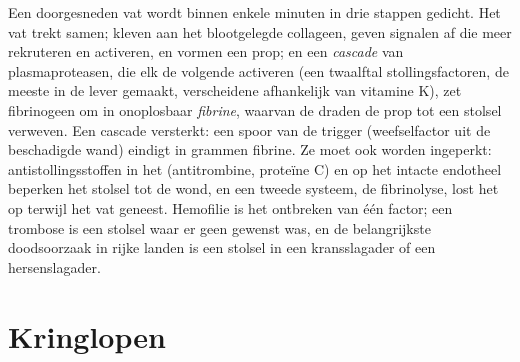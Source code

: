 \begin{proposition}[Hemostase]\label{prop:b2:blood-circulation:clotting}
Een doorgesneden vat wordt binnen enkele minuten in drie stappen gedicht.
Het vat trekt samen;  kleven aan het blootgelegde collageen,
geven signalen af die meer  rekruteren en activeren, en vormen
een prop; en een \emph{cascade} van plasmaproteasen, die elk de volgende
activeren (een twaalftal stollingsfactoren, de meeste in de lever gemaakt,
verscheidene afhankelijk van vitamine K), zet fibrinogeen om in onoplosbaar
\emph{fibrine}, waarvan de draden de prop tot een stolsel verweven. Een
cascade versterkt: een spoor van de trigger (weefselfactor uit de
beschadigde wand) eindigt in grammen fibrine. Ze moet ook worden ingeperkt:
antistollingsstoffen in het  (antitrombine, proteïne C) en op het
intacte endotheel beperken het stolsel tot de wond, en een tweede systeem,
de fibrinolyse, lost het op terwijl het vat geneest. Hemofilie is het
ontbreken van één factor; een trombose is een stolsel waar er geen gewenst
was, en de belangrijkste doodsoorzaak in rijke landen is een stolsel in een
kransslagader of een hersenslagader.
\end{proposition}

\section{Kringlopen}

